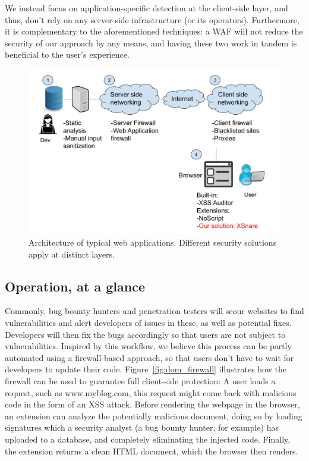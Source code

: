 We instead focus on application-specific detection at the client-side layer, and thus, don't rely on any server-side infrastructure (or its operators). Furthermore, it is complementary to the aforementioned techniques: a WAF will not reduce the security of our approach by any means, and having these two work in tandem is beneficial to the user's experience.

\begin{figure}[h]
	\includegraphics[scale=0.37]{img/web_app_architecture.pdf}
	\caption{Architecture of typical web applications. Different security solutions apply at distinct layers.}
	\label{fig:web_architecture}
\end{figure}


\subsection{Operation, at a glance}
 Commonly, bug bounty hunters and penetration testers will scour websites to find vulnerabilities and alert developers of issues in these, as well as potential fixes. Developers will then fix the bugs accordingly so that users are not subject to vulnerabilities. Inspired by this workflow, we believe this process can be partly automated using a firewall-based approach, so that users don't have to wait for developers to update their code. Figure~\ref{fig:dom_firewall} illustrates how the firewall can be used to guarantee full client-side protection: A user loads a request, such as www.myblog.com, this request might come back with malicious code in the form of an XSS attack. Before rendering the webpage in the browser, an extension can analyze the potentially malicious document, doing so by loading signatures which a security analyst (a bug bounty hunter, for example) has uploaded to a database, and completely eliminating the injected code. Finally, the extension returns a clean HTML document, which the browser then renders.
 

